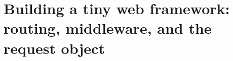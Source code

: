 \chapter{Building a tiny web framework: routing, middleware, and the request object}
\label{ch:building-a-tiny-web-framework-routing}

